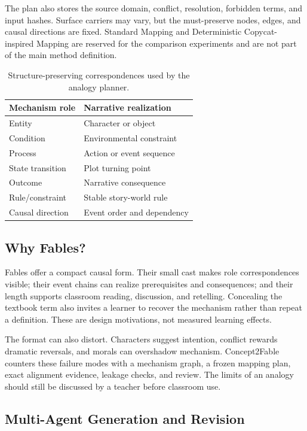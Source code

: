 \documentclass[letterpaper]{article} %
\begin{document}
The plan also stores the source domain, conflict, resolution, forbidden terms, and input hashes. Surface carriers may vary, but the must-preserve nodes, edges, and causal directions are fixed. Standard Mapping and Deterministic Copycat-inspired Mapping are reserved for the comparison experiments and are not part of the main method definition.

\begin{table}[t]
\centering
\small
\begin{tabular}{ll}
\toprule
Mechanism role & Narrative realization \\
\midrule
Entity & Character or object \\
Condition & Environmental constraint \\
Process & Action or event sequence \\
State transition & Plot turning point \\
Outcome & Narrative consequence \\
Rule/constraint & Stable story-world rule \\
Causal direction & Event order and dependency \\
\bottomrule
\end{tabular}
\caption{Structure-preserving correspondences used by the analogy planner.}
\label{tab:correspondence}
\end{table}

\subsection{Why Fables?}

Fables offer a compact causal form. Their small cast makes role correspondences visible; their event chains can realize prerequisites and consequences; and their length supports classroom reading, discussion, and retelling. Concealing the textbook term also invites a learner to recover the mechanism rather than repeat a definition. These are design motivations, not measured learning effects.

The format can also distort. Characters suggest intention, conflict rewards dramatic reversals, and morals can overshadow mechanism. Concept2Fable counters these failure modes with a mechanism graph, a frozen mapping plan, exact alignment evidence, leakage checks, and review. The limits of an analogy should still be discussed by a teacher before classroom use.

\subsection{Multi-Agent Generation and Revision}
\end{document}

